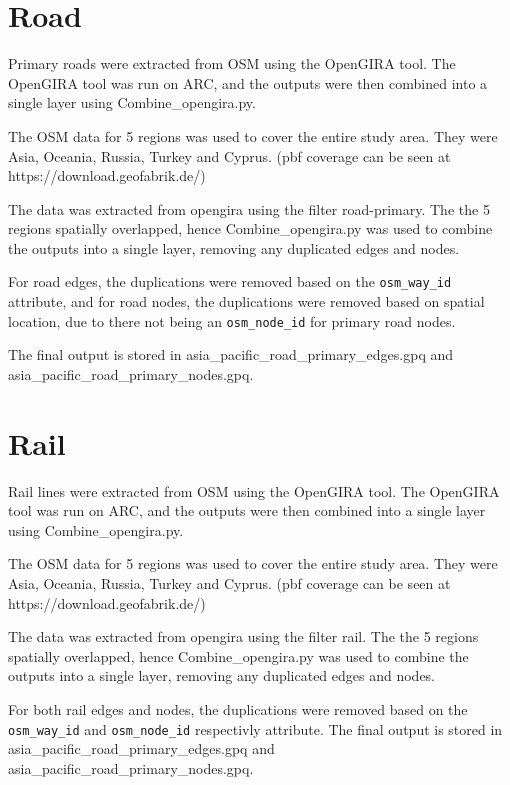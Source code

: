 \documentclass[11pt,a4paper]{article}
\begin{document}
\section{Road}

Primary roads were extracted from OSM using the OpenGIRA tool. The OpenGIRA tool was run on ARC, and the outputs were then combined into a single layer using Combine\_opengira.py.\par

The OSM data for 5 regions was used to cover the entire study area. They were Asia, Oceania, Russia, Turkey and Cyprus. (pbf coverage can be seen at https://download.geofabrik.de/)\par

The data was extracted from opengira using the filter road-primary. The the 5 regions spatially overlapped, hence Combine\_opengira.py was used to combine the outputs into a single layer, removing any duplicated edges and nodes. 

For road edges, the duplications were removed based on the
\texttt{osm\_way\_id} attribute, and for road nodes, the duplications were
removed based on spatial location, due to there not being an
\texttt{osm\_node\_id} for primary road nodes.\par

The final output is stored in asia\_pacific\_road\_primary\_edges.gpq and asia\_pacific\_road\_primary\_nodes.gpq.\par

\section{Rail}
Rail lines were extracted from OSM using the OpenGIRA tool. The OpenGIRA tool was run on ARC, and the outputs were then combined into a single layer using Combine\_opengira.py.\par

The OSM data for 5 regions was used to cover the entire study area. They were Asia, Oceania, Russia, Turkey and Cyprus. (pbf coverage can be seen at https://download.geofabrik.de/)\par

The data was extracted from opengira using the filter rail. The the 5 regions spatially overlapped, hence Combine\_opengira.py was used to combine the outputs into a single layer, removing any duplicated edges and nodes. 

For both rail edges and nodes, the duplications were removed based on the
\texttt{osm\_way\_id} and
\texttt{osm\_node\_id}  respectivly attribute.
The final output is stored in asia\_pacific\_road\_primary\_edges.gpq and asia\_pacific\_road\_primary\_nodes.gpq.\par
\end{document}

